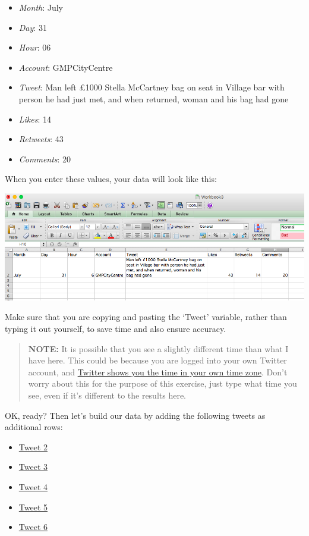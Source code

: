 \documentclass[
]{book}
\providecommand{\tightlist}{%
  \setlength{\itemsep}{0pt}\setlength{\parskip}{0pt}}
\begin{document}
\begin{itemize}
\tightlist
\item
  \emph{Month}: July
\item
  \emph{Day}: 31
\item
  \emph{Hour}: 06
\item
  \emph{Account}: GMPCityCentre
\item
  \emph{Tweet}: Man left £1000 Stella McCartney bag on seat in Village bar with person he had just met, and when returned, woman and his bag had gone
\item
  \emph{Likes}: 14
\item
  \emph{Retweets}: 43
\item
  \emph{Comments}: 20
\end{itemize}

When you enter these values, your data will look like this:

\includegraphics{imgs/tweet1_entered.png}

Make sure that you are copying and pasting the `Tweet' variable, rather than typing it out yourself, to save time and also ensure accuracy.

\begin{quote}
\textbf{NOTE:} It is possible that you see a slightly different time than what I have here. This could be because you are logged into your own Twitter account, and \href{http://www.adweek.com/digital/tweet-timestamps/}{Twitter shows you the time in your own time zone}. Don't worry about this for the purpose of this exercise, just type what time you see, even if it's different to the results here.
\end{quote}

OK, ready? Then let's build our data by adding the following tweets as additional rows:

\begin{itemize}
\tightlist
\item
  \href{https://twitter.com/GMPCityCentre/status/891762454337867776}{Tweet 2}
\item
  \href{https://twitter.com/GMPCityCentre/status/894515606321590273}{Tweet 3}
\item
  \href{https://twitter.com/GMPCityCentre/status/894024570109386752}{Tweet 4}
\item
  \href{https://twitter.com/GMPCityCentre/status/891247668772708352}{Tweet 5}
\item
  \href{https://twitter.com/GMPCityCentre/status/891254643078176768}{Tweet 6}
\end{itemize}
\end{document}
